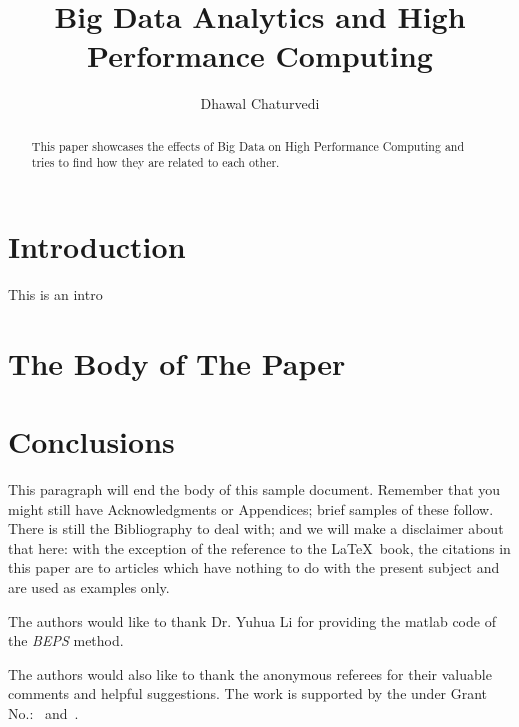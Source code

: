 \documentclass[sigconf]{acmart}
\begin{document}
\title{Big Data Analytics and High Performance Computing}

\author{Dhawal Chaturvedi}


\renewcommand{\shortauthors}{D.Chaturvedi}


\begin{abstract}
This paper showcases the effects of Big Data on High Performance Computing and tries to find how they are related to each other.
\end{abstract}



\maketitle

\section{Introduction}
This is an intro \cite{google}

\section{The Body of The Paper}


\section{Conclusions}

This paragraph will end the body of this sample document.  Remember
that you might still have Acknowledgments or Appendices; brief samples
of these follow.  There is still the Bibliography to deal with; and we
will make a disclaimer about that here: with the exception of the
reference to the \LaTeX\ book, the citations in this paper are to
articles which have nothing to do with the present subject and are
used as examples only.



\appendix

\begin{acks}

  The authors would like to thank Dr. Yuhua Li for providing the
  matlab code of the \textit{BEPS} method.

  The authors would also like to thank the anonymous referees for
  their valuable comments and helpful suggestions. The work is
  supported by the  under Grant
  No.:~
  and~.

\end{acks}


 
\end{document}
